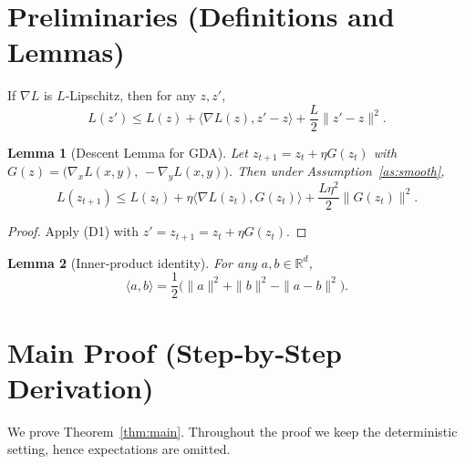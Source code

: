 \documentclass{article}
\newtheorem{lemma}{Lemma}
\begin{document}
\section*{Preliminaries (Definitions and Lemmas)}
\begin{definition}
If $\nabla L$ is $L$‑Lipschitz, then for any $z,z'$,
\[
L(z')\le L(z)+\langle\nabla L(z),z'-z\rangle+\frac{L}{2}\|z'-z\|^{2}. \tag{D1}
\]
\end{definition}
\begin{lemma}[Descent Lemma for GDA]\label{lem:descent}
Let $z_{t+1}=z_t+\eta G(z_t)$ with $G(z)=\big(\nabla_x L(x,y),\,-\nabla_y L(x,y)\big)$.
Then under Assumption~\ref{as:smooth},
\[
L(z_{t+1})\le L(z_t)+\eta\langle\nabla L(z_t),G(z_t)\rangle
+\frac{L\eta^{2}}{2}\|G(z_t)\|^{2}. \tag{D2}
\]
\end{lemma}
\begin{proof}
Apply (D1) with $z'=z_{t+1}=z_t+\eta G(z_t)$.
\end{proof}
\begin{lemma}[Inner‑product identity]\label{lem:inner}
For any $a,b\in\mathbb{R}^{d}$,
\[
\langle a,b\rangle=\frac12\big(\|a\|^{2}+\|b\|^{2}-\|a-b\|^{2}\big). \tag{D3}
\]
\end{lemma}

\section*{Main Proof (Step‑by‑Step Derivation)}
We prove Theorem~\ref{thm:main}.  Throughout the proof we keep the
deterministic setting, hence expectations are omitted.
\end{document}
